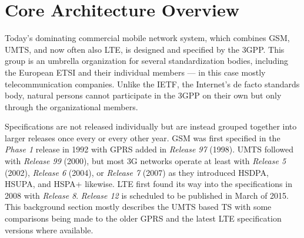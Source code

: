 \section{Core Architecture Overview}
\label{c4:sec:3gpparchitecture}

Today's dominating commercial mobile network system, which combines \gls{GSM}, \gls{UMTS}, and now often also \gls{LTE}, is designed and specified by the \gls{3GPP}. This group is an umbrella organization for several standardization bodies, including the European \gls{ETSI} and their individual members --- in this case mostly telecommunication companies. Unlike the \gls{IETF}, the Internet's de facto standards body, natural persons cannot participate in the \gls{3GPP} on their own but only through the organizational members.

Specifications are not released individually but are instead grouped together into larger releases once every or every other year. \gls{GSM} was first specified in the \textit{Phase 1} release in 1992 with \gls{GPRS} added in \textit{Release 97} (1998). \gls{UMTS} followed with \textit{Release 99} (2000), but most \gls{3G} networks operate at least with \textit{Release 5} (2002), \textit{Release 6} (2004), or \textit{Release 7} (2007) as they introduced \gls{HSDPA}, \gls{HSUPA}, and \gls{HSPA+} likewise. \gls{LTE} first found its way into the specifications in 2008 with \textit{Release 8}. \textit{Release 12} is scheduled to be published in March of 2015. This background section mostly describes the \gls{UMTS} based \gls{TS} with some comparisons being made to the older \gls{GPRS} and the latest \gls{LTE} specification versions where available.

